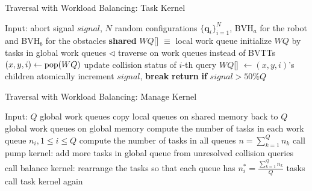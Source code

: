 \begin{algorithm}[htb]
    \caption{Traversal with Workload Balancing: Task Kernel}
    \label{algo:5:balancing:task}
    \begin{algorithmic}[1]
    \STATE Input: abort signal $signal$, $N$ random configurations $\{\mathbf{q}_i\}_{i=1}^N$, BVH$_a$ for the robot and BVH$_b$ for the obstacles
    \STATE \textbf{shared} $WQ$[] $\equiv$ local work queue
    \STATE initialize $WQ$ by tasks in global work queues
    \STATE $\lhd$ traverse on work queues instead of BVTTs
    \LOOP
    \STATE $(x,y,i) \leftarrow \operatorname{pop}(WQ)$
                \STATE update collision status of $i$-th query
            \ENDIF
        \ELSE
            \STATE $WQ$[] $\leftarrow (x,y,i)$'s children
        \ENDIF
    \ENDIF
    \STATE atomically increment $signal$, \textbf{break}
    \ENDIF
    \ENDLOOP
    \STATE \textbf{return} \textbf{if} $signal > 50\% Q $
    \end{algorithmic}
\end{algorithm}

\begin{algorithm}[htb]
    \caption{Traversal with Workload Balancing: Manage Kernel}
    \label{algo:5:balancing}
    \begin{algorithmic}[1]
    \STATE Input: $Q$ global work queues
    \STATE copy local queues on shared memory back to $Q$ global work queues on global memory
    \STATE compute the number of tasks in each work queue $n_i, 1\leq i\leq Q$
    \STATE compute the number of tasks in all queues $n = \sum_{k=1}^Q n_k$
    \STATE call pump kernel: add more tasks in global queue from unresolved collision queries
    \STATE call balance kernel: rearrange the tasks so that each queue has $n_i^* = \frac{\sum_{k=1}^Q n_k}{Q}$ tasks
    \ENDIF
    \STATE call task kernel again
    \end{algorithmic}
\end{algorithm}

